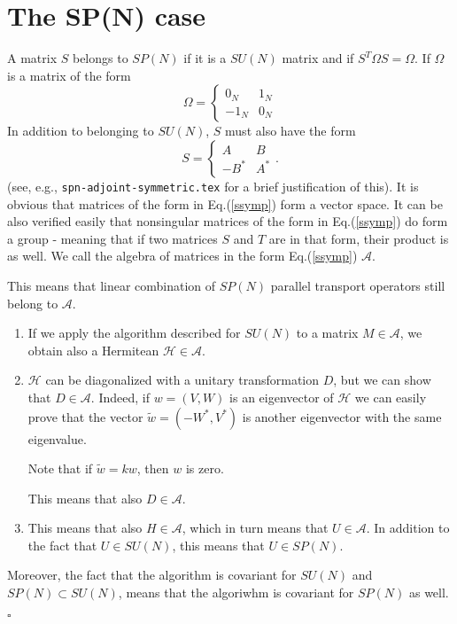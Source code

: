 \documentclass[a4paper,10pt]{article}
\newcommand*{\QEDB}{\null\nobreak\hfill\ensuremath{\square}}
\begin{document}
\section{The SP(N) case}

A matrix $S$ belongs to $SP(N)$ if it is a $SU(N)$ matrix and if
$S^{T} \Omega S = \Omega$. If $\Omega$ is a matrix of the form
\begin{equation}
  \Omega = \left\{
    \begin{array}{cc}
      0_{N} & 1_{N} \\
      -1_{N} & 0_{N}
    \end{array}
  \right.
  \label{omega}
\end{equation}
In addition to belonging to $SU(N)$, $S$ must also have the form
\begin{equation}
  S = \left\{
    \begin{array}{cc}
      A & B \\
      -B^\ast & A^\ast
    \end{array}
  \right. .
  \label{ssymp}
\end{equation}
(see, e.g., \verb|spn-adjoint-symmetric.tex| for a brief justification of this).
It is obvious that matrices of the form in Eq.(\ref{ssymp}) form a vector space.
It can be also verified easily that nonsingular matrices of the form in
Eq.(\ref{ssymp}) do form a group - meaning that if two matrices $S$ and $T$ are in
that form, their product is as well. We call the algebra of matrices in the form
Eq.(\ref{ssymp}) $\mathcal{A}$.

This means that linear combination of $SP(N)$ parallel transport operators still
belong to $\mathcal{A}$.

\begin{enumerate}
  \item If we apply the algorithm described for $SU(N)$ to a matrix
    $M \in \mathcal{A}$, we obtain also a Hermitean $\mathcal{H}\in \mathcal{A}$.
  \item $\mathcal{H}$ can be diagonalized with a unitary transformation $D$, but
    we can show that $D \in \mathcal{A}$. Indeed, if $w = (V ,W)$ is an
    eigenvector of $\mathcal{H}$ we can easily prove that the vector
    $\tilde{w} = (-W^{\ast},V^{\ast})$ is another eigenvector with the same
    eigenvalue.

    Note that if $\tilde{w} = k w$, then $w$ is zero.

    This means that also $D \in \mathcal{A}$.
  \item This means that also $H \in \mathcal{A}$, which in turn means that
    $U \in \mathcal{A}$. In addition to the fact that $U \in SU(N)$, this means
    that $U \in SP(N)$.
\end{enumerate}

Moreover, the fact that the algorithm is covariant for $SU(N)$ and
$SP(N) \subset SU(N)$, means that the algoriwhm is covariant for $SP(N)$ as well.

\QEDB
\end{document}

